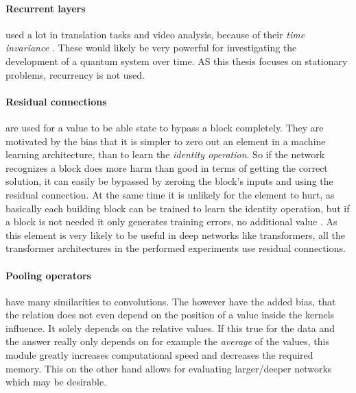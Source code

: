 \paragraph{Recurrent layers} used a lot in translation tasks and video analysis, because of their \emph{time invariance} \cite{relationalInductiveBiasesAndGraphNetworks}. 
These would likely be very powerful for investigating the development of a quantum system over time. 
AS this thesis focuses on stationary problems, recurrency is not used.

\paragraph{Residual connections} are used for a value to be able state to bypass a block completely.
They are motivated by the bias that it is simpler to zero out an element in a machine learning architecture, than to learn the \emph{identity operation}. 
So if the network recognizes a block does more harm than good in terms of getting the correct solution, it can easily be bypassed by zeroing the block's inputs and using the residual connection. 
At the same time it is unlikely for the element to hurt, as basically each building block can be trained to learn the identity operation, but if a block is not needed it only generates training errors, no additional value \cite{deepResidualLearningForImageRecognition}.
As this element is very likely to be useful in deep networks like transformers, all the transformer architectures in the performed experiments use residual connections.

\paragraph{Pooling operators} have many similarities to convolutions. The however have the added bias, that the relation does not even depend on the position of a value inside the kernels influence. 
It solely depends on the relative values. 
If this true for the data and the answer really only depends on for example the \emph{average} of the values, this module greatly increases computational speed and decreases the required memory.
This on the other hand allows for evaluating larger/deeper networks which may be desirable.